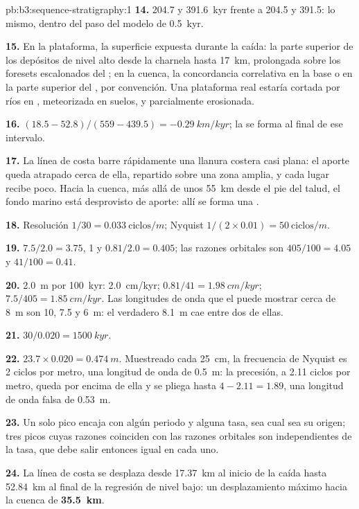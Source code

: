 \begin{solution}{pb:b3:sequence-stratigraphy:1}
\textbf{14.} 204.7 y \qty{391.6}{kyr} frente a 204.5 y 391.5: lo mismo,
dentro del paso del modelo de \qty{0.5}{kyr}.

\textbf{15.} En la plataforma, la superficie expuesta durante la caída: la parte superior de
los depósitos de nivel alto desde la charnela hasta \qty{17}{km}, prolongada sobre los
foresets escalonados del ; en la cuenca, la concordancia correlativa
en la base o en la parte superior del , por convención. Una
plataforma real estaría cortada por ríos en , meteorizada en suelos,
y parcialmente erosionada.

\textbf{16.} $(18.5 - 52.8)/(559 - 439.5) = \qty{-0.29}{km/kyr}$; la
 se forma al final de ese intervalo.

\textbf{17.} La línea de costa barre rápidamente una llanura costera casi plana:
el aporte queda atrapado cerca de ella, repartido sobre una zona amplia, y cada lugar
recibe poco. Hacia la cuenca, más allá de unos \qty{55}{km} desde el pie del talud, el fondo marino
está desprovisto de aporte: allí se forma una .

\textbf{18.} Resolución $1/30 = \qty{0.033}{\text{ciclos}/m}$; Nyquist $1/(2\times
0.01) = \qty{50}{\text{ciclos}/m}$.

\textbf{19.} $7.5/2.0 = 3.75$, 1 y $0.81/2.0 = 0.405$; las razones orbitales
son $405/100 = 4.05$ y $41/100 = 0.41$.

\textbf{20.} \qty{2.0}{m} por \qty{100}{kyr}: \qty{2.0}{cm/kyr}; $0.81/41 =
\qty{1.98}{cm/kyr}$; $7.5/405 = \qty{1.85}{cm/kyr}$. Las longitudes de onda que
el  puede mostrar cerca de \qty{8}{m} son 10, 7.5 y \qty{6}{m}: el verdadero
\qty{8.1}{m} cae entre dos de ellas.

\textbf{21.} $30/0.020 = \qty{1500}{kyr}$.

\textbf{22.} $23.7\times0.020 = \qty{0.474}{m}$. Muestreado cada
\qty{25}{cm}, la frecuencia de Nyquist es 2 ciclos por metro, una longitud de onda de
\qty{0.5}{m}: la precesión, a 2.11 ciclos por metro, queda por encima de ella y
se pliega hasta $4 - 2.11 = 1.89$, una longitud de onda falsa de \qty{0.53}{m}.

\textbf{23.} Un solo pico encaja con algún periodo y alguna tasa, sea cual sea su
origen; tres picos cuyas razones coinciden con las razones orbitales son independientes de
la tasa, que debe salir entonces igual en cada uno.

\textbf{24.} La línea de costa se desplaza desde \qty{17.37}{km} al inicio de la
caída hasta \qty{52.84}{km} al final de la regresión de nivel bajo: un desplazamiento
máximo hacia la cuenca de \textbf{\qty[text-series-to-math=true]{35.5}{km}}.
\end{solution}
